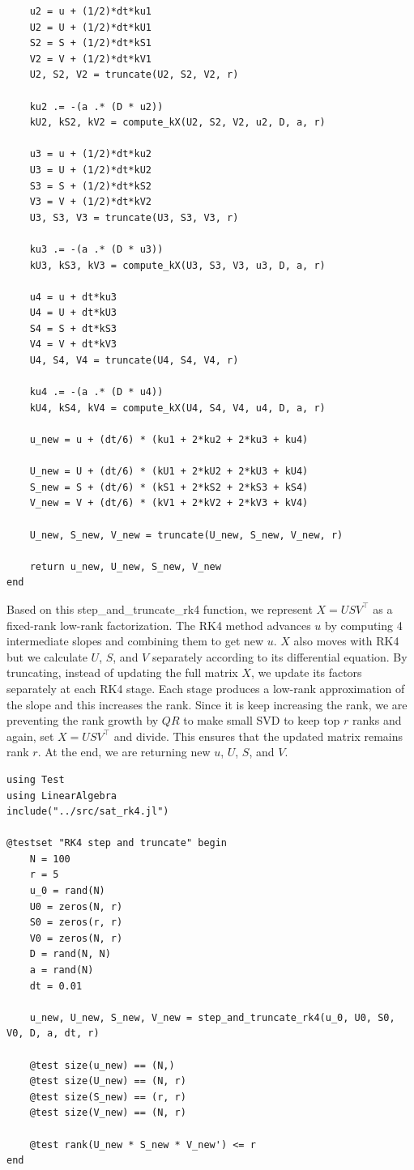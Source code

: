 \documentclass[11pt]{article}
\begin{document}
\begin{lstlisting}
    u2 = u + (1/2)*dt*ku1
    U2 = U + (1/2)*dt*kU1
    S2 = S + (1/2)*dt*kS1
    V2 = V + (1/2)*dt*kV1
    U2, S2, V2 = truncate(U2, S2, V2, r)

    ku2 .= -(a .* (D * u2))
    kU2, kS2, kV2 = compute_kX(U2, S2, V2, u2, D, a, r)

    u3 = u + (1/2)*dt*ku2
    U3 = U + (1/2)*dt*kU2
    S3 = S + (1/2)*dt*kS2
    V3 = V + (1/2)*dt*kV2
    U3, S3, V3 = truncate(U3, S3, V3, r)

    ku3 .= -(a .* (D * u3))
    kU3, kS3, kV3 = compute_kX(U3, S3, V3, u3, D, a, r)

    u4 = u + dt*ku3
    U4 = U + dt*kU3
    S4 = S + dt*kS3
    V4 = V + dt*kV3
    U4, S4, V4 = truncate(U4, S4, V4, r)

    ku4 .= -(a .* (D * u4))
    kU4, kS4, kV4 = compute_kX(U4, S4, V4, u4, D, a, r)

    u_new = u + (dt/6) * (ku1 + 2*ku2 + 2*ku3 + ku4)

    U_new = U + (dt/6) * (kU1 + 2*kU2 + 2*kU3 + kU4)
    S_new = S + (dt/6) * (kS1 + 2*kS2 + 2*kS3 + kS4)
    V_new = V + (dt/6) * (kV1 + 2*kV2 + 2*kV3 + kV4)

    U_new, S_new, V_new = truncate(U_new, S_new, V_new, r)

    return u_new, U_new, S_new, V_new
end

\end{lstlisting}

Based on this step\_and\_truncate\_rk4 function, we represent $X = USV^\top$ as a fixed-rank low-rank factorization.
The RK4 method advances $u$ by computing 4 intermediate slopes and combining them to get new $u$. $X$ also moves with RK4 but we calculate $U$, $S$, and $V$ separately according to its differential equation. By truncating, instead of updating the full matrix $X$, we update its factors separately at each RK4 stage. Each stage produces a low-rank approximation of the slope and this increases the rank. Since it is keep increasing the rank, we are preventing the rank growth by $QR$ to make small SVD to keep top $r$ ranks and again, set $X = USV^\top$ and divide. This ensures that the updated matrix remains rank $r$. At the end, we are returning new $u$, $U$, $S$, and $V$.

\begin{lstlisting}
using Test
using LinearAlgebra
include("../src/sat_rk4.jl")

@testset "RK4 step and truncate" begin
    N = 100
    r = 5
    u_0 = rand(N)
    U0 = zeros(N, r)
    S0 = zeros(r, r)
    V0 = zeros(N, r)
    D = rand(N, N)
    a = rand(N)
    dt = 0.01

    u_new, U_new, S_new, V_new = step_and_truncate_rk4(u_0, U0, S0, V0, D, a, dt, r)

    @test size(u_new) == (N,)
    @test size(U_new) == (N, r)
    @test size(S_new) == (r, r)
    @test size(V_new) == (N, r)

    @test rank(U_new * S_new * V_new') <= r
end
\end{lstlisting}
\end{document}
